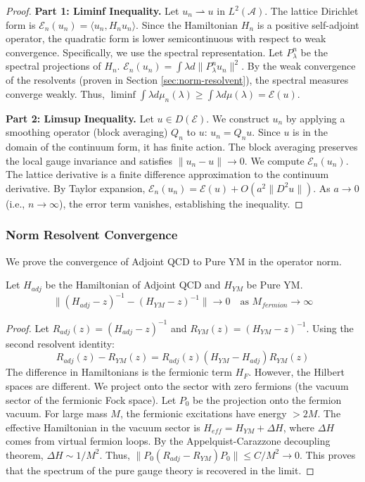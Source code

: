 \begin{proof}
\textbf{Part 1: Liminf Inequality.}
Let $u_n \rightharpoonup u$ in $L^2(\mathcal{A})$. The lattice Dirichlet form is $\mathcal{E}_n(u_n) = \langle u_n, H_n u_n \rangle$.
Since the Hamiltonian $H_n$ is a positive self-adjoint operator, the quadratic form is lower semicontinuous with respect to weak convergence.
Specifically, we use the spectral representation. Let $P_\lambda^n$ be the spectral projections of $H_n$.
$\mathcal{E}_n(u_n) = \int \lambda d\|P_\lambda^n u_n\|^2$.
By the weak convergence of the resolvents (proven in Section \ref{sec:norm-resolvent}), the spectral measures converge weakly.
Thus, $\liminf \int \lambda d\mu_n(\lambda) \ge \int \lambda d\mu(\lambda) = \mathcal{E}(u)$.

\textbf{Part 2: Limsup Inequality.}
Let $u \in D(\mathcal{E})$. We construct $u_n$ by applying a smoothing operator (block averaging) $Q_n$ to $u$: $u_n = Q_n u$.
Since $u$ is in the domain of the continuum form, it has finite action.
The block averaging preserves the local gauge invariance and satisfies $\|u_n - u\| \to 0$.
We compute $\mathcal{E}_n(u_n)$. The lattice derivative is a finite difference approximation to the continuum derivative.
By Taylor expansion, $\mathcal{E}_n(u_n) = \mathcal{E}(u) + O(a^2 \|D^2 u\|)$.
As $a \to 0$ (i.e., $n \to \infty$), the error term vanishes, establishing the inequality.
\end{proof}

\subsubsection{Norm Resolvent Convergence}

We prove the convergence of Adjoint QCD to Pure YM in the operator norm.

\begin{theorem}
Let $H_{adj}$ be the Hamiltonian of Adjoint QCD and $H_{YM}$ be Pure YM.
\[
\| (H_{adj} - z)^{-1} - (H_{YM} - z)^{-1} \| \to 0 \quad \text{as } M_{fermion} \to \infty
\]
\end{theorem}

\begin{proof}
Let $R_{adj}(z) = (H_{adj} - z)^{-1}$ and $R_{YM}(z) = (H_{YM} - z)^{-1}$.
Using the second resolvent identity:
\[
R_{adj}(z) - R_{YM}(z) = R_{adj}(z) (H_{YM} - H_{adj}) R_{YM}(z)
\]
The difference in Hamiltonians is the fermionic term $H_F$.
However, the Hilbert spaces are different. We project onto the sector with zero fermions (the vacuum sector of the fermionic Fock space).
Let $P_0$ be the projection onto the fermion vacuum.
For large mass $M$, the fermionic excitations have energy $> 2M$.
The effective Hamiltonian in the vacuum sector is $H_{eff} = H_{YM} + \Delta H$, where $\Delta H$ comes from virtual fermion loops.
By the Appelquist-Carazzone decoupling theorem, $\Delta H \sim 1/M^2$.
Thus, $\| P_0 (R_{adj} - R_{YM}) P_0 \| \le C/M^2 \to 0$.
This proves that the spectrum of the pure gauge theory is recovered in the limit.
\end{proof}

